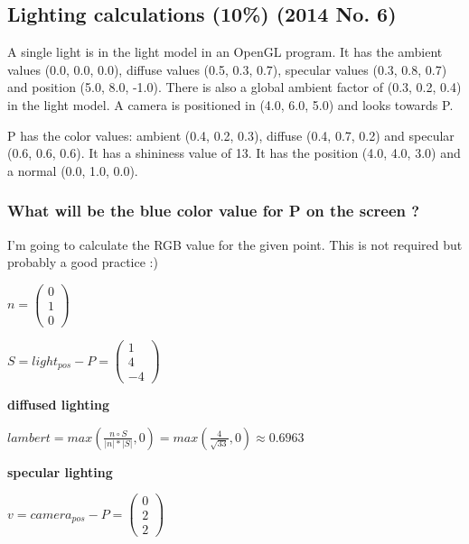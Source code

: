 \subsection{Lighting calculations (10\%) (2014 No. 6)}
A single light is in the light model in an OpenGL program. It has the ambient values (0.0, 0.0, 0.0), diffuse values (0.5, 0.3, 0.7), specular values (0.3, 0.8, 0.7) and position (5.0, 8.0, -1.0). There is also a global ambient factor of (0.3, 0.2, 0.4) in the light model. A camera is positioned in (4.0, 6.0, 5.0) and looks towards P.

P has the color values: ambient (0.4, 0.2, 0.3), diffuse (0.4, 0.7, 0.2) and specular (0.6, 0.6, 0.6). It has a shininess value of 13. It has the position (4.0, 4.0, 3.0) and a normal (0.0, 1.0, 0.0).

\subsubsection{What will be the blue color value for P on the screen ?}
I'm going to calculate the RGB value for the given point. This is not required but probably a good practice :)

$
    n
=
    \left(\begin{array}{c}
        0\\
        1\\
        0
    \end{array}\right)
$

$
    S
=
    light_{pos}
    -
    P
=
    \left(\begin{array}{c}
        1\\
        4\\
        -4
    \end{array}\right)
$

\textbf{diffused lighting}

$
    lambert
=
    max\left(
        \frac{
            n
            \circ
            S
        }{
            | n | * | S |
        }
        , 
        0
    \right)
=
    max\left(
        \frac{4}{\sqrt{33}}
        ,
        0
    \right)
\approx
    0.6963
$

\textbf{specular lighting}

$
    v
=
    camera_{pos}
    -
    P
=
    \left(\begin{array}{c}
        0\\
        2\\
        2
    \end{array}\right)
$

